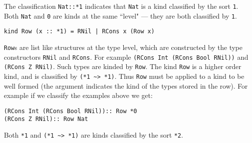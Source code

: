 \documentclass{sigplanconf}
\begin{document}
The classification {\tt Nat::*1} indicates that {\tt Nat} is a kind classified
by the sort {\tt *1}. Both {\tt Nat} and {\tt *0} are kinds at the same
``level"  --- they are both classified by {\tt *1}.

\begin{verbatim}
kind Row (x :: *1) = RNil | RCons x (Row x)
\end{verbatim}

\noindent
{\tt Row}s are list like structures at the type level,
which are constructed by the type constructors {\tt RNil} and {\tt RCons}.
For example {\tt (RCons Int (RCons Bool RNil))} and {\tt (RCons Z RNil)}.
Such types are kinded by {\tt Row}.
The kind {\tt Row} is a higher order kind, and is classified by
\verb+(*1 ~> *1)+.  Thus {\tt Row} must be applied to a kind to be well formed
(the argument indicates the kind of the types stored in the row).
For example if we classify the examples above we get:
\begin{verbatim}
(RCons Int (RCons Bool RNil)):: Row *0
(RCons Z RNil):: Row Nat
\end{verbatim}
\noindent
Both \verb+*1+ and \verb+(*1 ~> *1)+ are
kinds classified by the sort \verb+*2+.  
\end{document}
